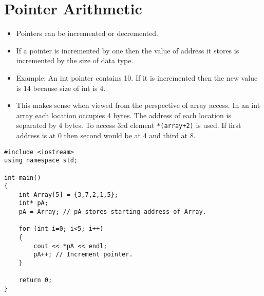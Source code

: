 \documentclass[12pt,a4paper]{article}
\begin{document}
\section{Pointer Arithmetic}
\begin{itemize}
\item Pointers can be incremented or decremented.
\item If a pointer is incremented by one then the value of address it stores is incremented by the size of data type.
\item Example: An int pointer contains 10. If it is incremented then the new value is 14 because size of int is 4.
\item This makes sense when viewed from the perspective of array access. In an int array each location occupies 4 bytes. The address of each location is separated by 4 bytes. To access 3rd element \verb|*(array+2)| is used. If first address is at 0 then second would be at 4 and third at 8.
\end{itemize} 
\begin{lstlisting}[caption={Pointer Arithmetic}]
#include <iostream>
using namespace std;

int main()
{
	int Array[5] = {3,7,2,1,5};
	int* pA;
	pA = Array; // pA stores starting address of Array.
	
	for (int i=0; i<5; i++)
	{
		cout << *pA << endl;
		pA++; // Increment pointer.
	}

	return 0;
}
\end{lstlisting}
\end{document}
